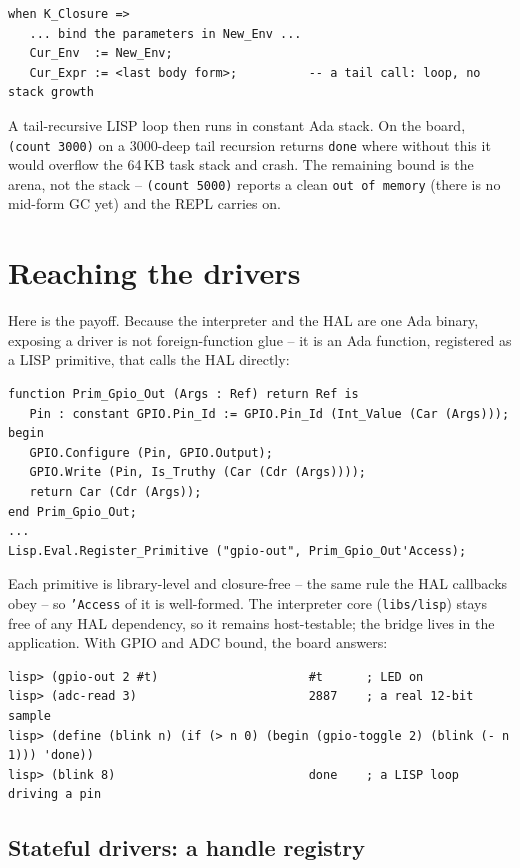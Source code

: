 \begin{lstlisting}
when K_Closure =>
   ... bind the parameters in New_Env ...
   Cur_Env  := New_Env;
   Cur_Expr := <last body form>;          -- a tail call: loop, no stack growth
\end{lstlisting}

A tail-recursive LISP loop then runs in constant Ada stack. On the board,
\texttt{(count 3000)} on a 3000-deep tail recursion returns \texttt{done} where
without this it would overflow the 64\,KB task stack and crash. The remaining bound
is the arena, not the stack -- \texttt{(count 5000)} reports a clean
\texttt{out of memory} (there is no mid-form GC yet) and the REPL carries on.

\section{Reaching the drivers}

Here is the payoff. Because the interpreter and the HAL are one Ada binary, exposing
a driver is not foreign-function glue -- it is an Ada function, registered as a LISP
primitive, that calls the HAL directly:

\begin{lstlisting}
function Prim_Gpio_Out (Args : Ref) return Ref is
   Pin : constant GPIO.Pin_Id := GPIO.Pin_Id (Int_Value (Car (Args)));
begin
   GPIO.Configure (Pin, GPIO.Output);
   GPIO.Write (Pin, Is_Truthy (Car (Cdr (Args))));
   return Car (Cdr (Args));
end Prim_Gpio_Out;
...
Lisp.Eval.Register_Primitive ("gpio-out", Prim_Gpio_Out'Access);
\end{lstlisting}

Each primitive is library-level and closure-free -- the same rule the HAL callbacks
obey -- so \texttt{'Access} of it is well-formed. The interpreter core
(\texttt{libs/lisp}) stays free of any HAL dependency, so it remains host-testable;
the bridge lives in the application. With GPIO and ADC bound, the board answers:

\begin{lstlisting}[style=sh]
lisp> (gpio-out 2 #t)                     #t      ; LED on
lisp> (adc-read 3)                        2887    ; a real 12-bit sample
lisp> (define (blink n) (if (> n 0) (begin (gpio-toggle 2) (blink (- n 1))) 'done))
lisp> (blink 8)                           done    ; a LISP loop driving a pin
\end{lstlisting}

\subsection{Stateful drivers: a handle registry}

